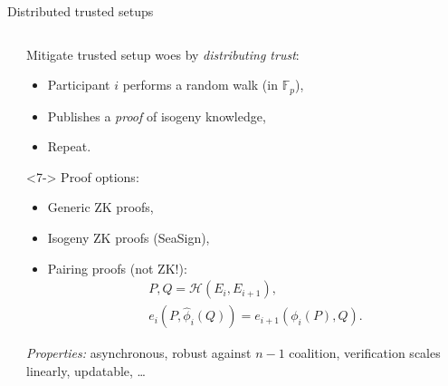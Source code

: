 \documentclass[aspectratio=169]{beamer}
\newcommand{\F}{\mathbb{F}}
\begin{document}

\begin{frame}{Distributed trusted setups}
  \begin{columns}
    \begin{column}{0.4\textwidth}
    \end{column}
    \begin{column}{0.55\textwidth}
      Mitigate trusted setup woes by \emph{distributing trust}:
      \begin{itemize}
      \item<1-> Participant $i$ performs a random walk (in $\F_p$),
      \item<2-> Publishes a \emph{proof} of isogeny knowledge,
      \item<3-> Repeat.
      \end{itemize}

      \smallskip
      \begin{uncoverenv}<7->
        Proof options:
        \begin{itemize}
        \item Generic ZK proofs,
        \item Isogeny ZK proofs (SeaSign),
        \item Pairing proofs (not ZK!):
          \begin{gather*}
            P, Q = \mathcal{H}(E_i,E_{i+1}),\\
            e_i(P,\hat\phi_i(Q)) = e_{i+1}(\phi_i(P),Q).
          \end{gather*}
        \end{itemize}
      
        \smallskip \emph{Properties:} asynchronous, robust against
        $n-1$ coalition, verification scales linearly, updatable,
        \dots
      \end{uncoverenv}
    \end{column}
  \end{columns}
\end{frame}
\end{document}
